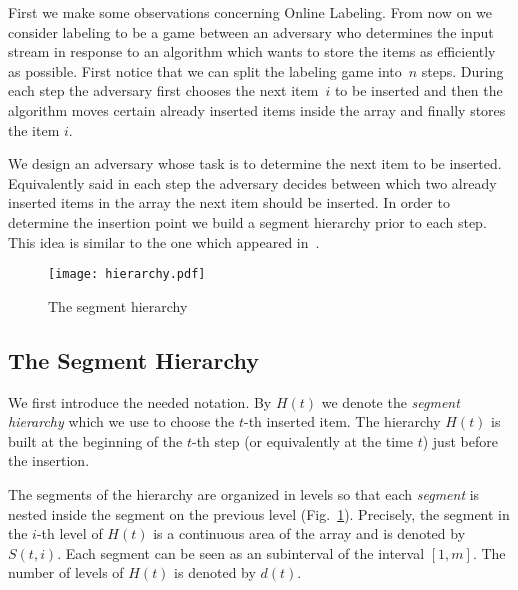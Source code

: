 \documentclass{llncs}
\newcommand{\hS}[2]{S\left(#1, #2\right)}
\newcommand{\hH}[1]{H\left(#1\right)}
\begin{document}
First we make some observations concerning Online Labeling.
From now on we consider labeling to be a game between an adversary who determines the input stream in response to an algorithm which wants to store the items as efficiently as possible.
First notice that we can split the labeling game into~$n$ steps.
During each step the adversary first chooses the next item~$i$ to be inserted and then the algorithm moves certain already inserted items inside the array and finally stores the item $i$.


We design an adversary whose task is to determine the next item to be inserted.
Equivalently said in each step the adversary decides between which two already inserted items in the array the next item should be inserted.
In order to determine the insertion point we build a segment hierarchy prior to each step.
This idea is similar to the one which appeared in~\cite{Bulaneketal}.

\begin{figure}
\texttt{[image: hierarchy.pdf]}
\caption{The segment hierarchy}
\label{fig:segment-hierarchy}
\end{figure}

\subsection{The Segment Hierarchy}

We first introduce the needed notation.
By $\hH{t}$ we denote the \emph{segment hierarchy} which we use to choose the $t$-th inserted item.
The hierarchy $\hH{t}$ is built at the beginning of the $t$-th step (or equivalently at the time $t$) just before the insertion.

The segments of the hierarchy are organized in levels so that each \emph{segment} is nested inside the segment on the previous level (Fig.~\ref{fig:segment-hierarchy}).
Precisely, the segment in the $i$-th level of $\hH{t}$ is a continuous area of the array and is denoted by $\hS{t}{i}$.
Each segment can be seen as an subinterval of the interval $[1, m]$.
The number of levels of $\hH{t}$ is denoted by $d(t)$.
\end{document}

